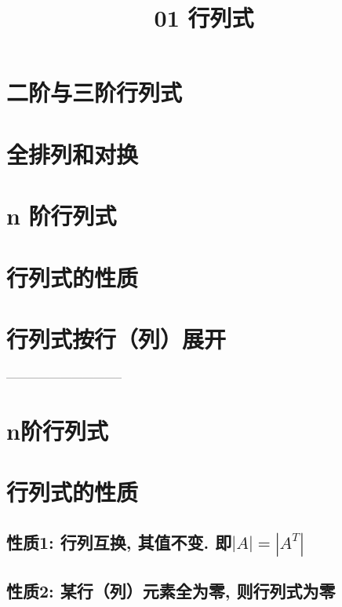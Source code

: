 \documentclass[UTF8]{ctexart}
\title{01 行列式}
\begin{document}
	\tableofcontents %
	\date{} %
	\maketitle  %
	
	\section{二阶与三阶行列式}
	
	
	\section{全排列和对换}
	
	
	\section{n 阶行列式}
	
	
	\section{行列式的性质}
	
	
	\section{行列式按行（列）展开}
	
	
	
	
	--------------------------------
	
	\section{n阶行列式}
	
	
	\section{行列式的性质}
	
	\subsection{性质1: 行列互换, 其值不变. 即$|A|=\left| A^T \right|$}
	
	\subsection{性质2: 某行（列）元素全为零, 则行列式为零}
	
\end{document}
